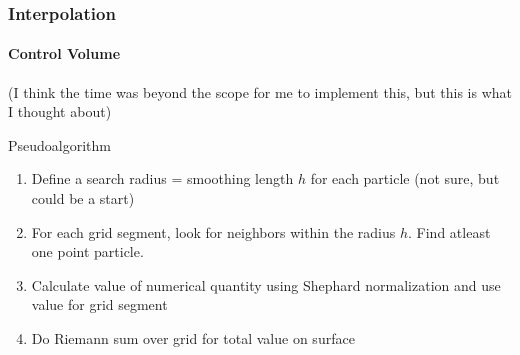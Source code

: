 \documentclass[notheorems, aspectratio=169]{beamer}
\begin{document}
  \begin{frame}
    \frametitle{Interpolation}
    \framesubtitle{Control Volume}

    (I think the time was beyond the scope for me to implement this, but this is what I thought about)
    \begin{block}{Pseudoalgorithm}
      \begin{enumerate}
        \item Define a search radius = smoothing length $h$ for each particle (not sure, but could be a start)
        \item For each grid segment, look for neighbors within the radius $h$. Find atleast one point particle.
        \item Calculate value of numerical quantity using Shephard normalization and use value for grid segment
        \item Do Riemann sum over grid for total value on surface 
      \end{enumerate}
    \end{block}
  

  
  \end{frame}
  
  
\end{document}
